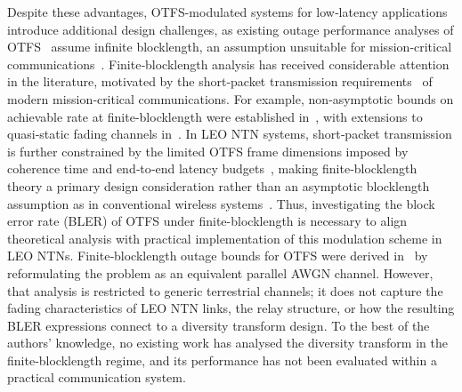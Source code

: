 \documentclass[journal]{IEEEtran}
\begin{document}
Despite these advantages, OTFS-modulated systems for low‑latency applications introduce additional design challenges, as existing outage performance analyses of OTFS~\cite{Shi2022} assume infinite blocklength, an assumption unsuitable for mission‑critical communications~\cite{10529933}. Finite‑blocklength analysis has received considerable attention in the literature, motivated by the short‑packet transmission requirements~\cite{Durisi2016, Basnayaka2022,9528059} of modern mission‑critical communications. For example, non‑asymptotic bounds on achievable rate at finite-blocklength were established in~\cite{Polyanskiy2010}, with extensions to quasi‑static fading channels in~\cite{Yang2014, Durisi2016, Makki2014}. In LEO NTN systems, short‑packet transmission is further constrained by the limited OTFS frame dimensions imposed by coherence time and end‑to‑end latency budgets~\cite{10847811}, making finite‑blocklength theory a primary design consideration rather than an asymptotic blocklength assumption as in conventional wireless systems~\cite{Basnayaka2022,Makki2014}. Thus, investigating the block error rate (BLER) of OTFS under finite-blocklength is necessary to align theoretical analysis with practical implementation of this modulation scheme in LEO NTNs. Finite‑blocklength outage bounds for OTFS were derived in~\cite{Zhang2024} by reformulating the problem as an equivalent parallel AWGN channel. However, that analysis is restricted to generic terrestrial channels; it does not capture the fading characteristics of LEO NTN links, the relay structure, or how the resulting BLER expressions connect to a diversity transform design. To the best of the authors’ knowledge, no existing work has analysed the diversity transform in the finite‑blocklength regime, and its performance has not been evaluated within a practical communication system.
\end{document}

